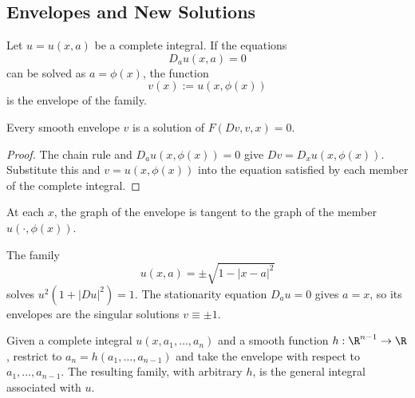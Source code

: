 \subsection{Envelopes and New Solutions}
\label{sec:envelopes-new-solutions}

\begin{definition}[Envelope]
\label{def:envelope}
Let $u=u(x,a)$ be a complete integral. If the equations
\[
D_a u(x,a)=0
\]
can be solved as $a=\phi(x)$, the function
\[
v(x):=u(x,\phi(x))
\]
is the envelope of the family.
\end{definition}

\begin{theorem}
\label{thm:envelope-solves-pde}
Every smooth envelope $v$ is a solution of $F(Dv,v,x)=0$.
\end{theorem}

\begin{proof}
\sketch The chain rule and $D_a u(x,\phi(x))=0$ give
$Dv=D_xu(x,\phi(x))$. Substitute this and $v=u(x,\phi(x))$ into the
equation satisfied by each member of the complete integral.
\end{proof}

\begin{remark}
\label{rem:envelope-tangency}
At each $x$, the graph of the envelope is tangent to the graph of the member
$u(\cdot,\phi(x))$.
\end{remark}

\begin{example}[Envelope of a complete integral for $u^2(1+|Du|^2)=1$]
\label{ex:envelope-singular-integral}
The family
\[
u(x,a)=\pm\sqrt{1-|x-a|^2}
\]
solves $u^2(1+|Du|^2)=1$. The stationarity equation $D_a u=0$ gives
$a=x$, so its envelopes are the singular solutions $v\equiv\pm1$.
\end{example}

\begin{definition}
\label{def:general-integral}
Given a complete integral $u(x,a_1,\ldots,a_n)$ and a smooth function
$h:\R^{n-1}\to\R$, restrict to $a_n=h(a_1,\ldots,a_{n-1})$ and take the
envelope with respect to $a_1,\ldots,a_{n-1}$. The resulting family, with
arbitrary $h$, is the general integral associated with $u$.
\end{definition}


